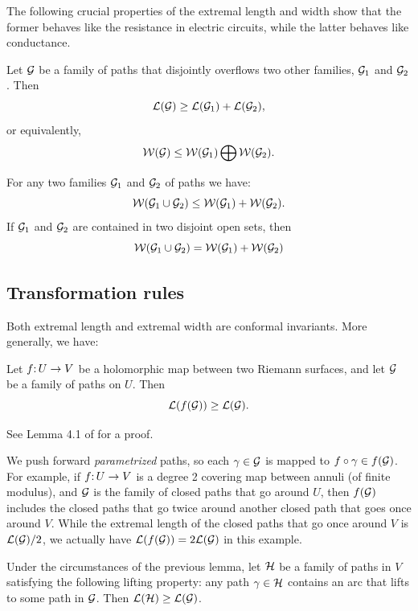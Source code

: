 The following crucial properties of the extremal length and width show
that the former behaves like the resistance in electric circuits,
while the latter behaves like conductance.

\begin{serieslaw}
Let ${\mathcal G}$ be a family of paths that disjointly overflows two other families,
                      ${\mathcal G}_1$ and ${\mathcal G}_2$.
Then
$$  {\mathcal L}({\mathcal G}) \geq {\mathcal L}({\mathcal G}_1) + {\mathcal L}({\mathcal G}_2), $$
or equivalently,
$$  {\mathcal W}({\mathcal G})\leq {\mathcal W}({\mathcal G}_1)\bigoplus {\mathcal W}({\mathcal G}_2). $$
\end{serieslaw}

\begin{parallellaw}
  For any two families ${\mathcal G}_1$ and ${\mathcal G}_2$ of paths we have:
$$
    {\mathcal W}({\mathcal G}_1\cup {\mathcal G}_2)\leq {\mathcal W}({\mathcal G}_1) + {\mathcal W}({\mathcal G}_2).
$$
If ${\mathcal G}_1$ and ${\mathcal G}_2$ are contained in two disjoint open sets, then
$$
  {\mathcal W}({\mathcal G}_1\cup {\mathcal G}_2) = {\mathcal W}({\mathcal G}_1) + {\mathcal W}({\mathcal G}_2)
$$
\end{parallellaw}



\subsection{Transformation rules}\label{trans rules sec}
 Both extremal length and extremal width  are conformal invariants.
 More generally, we have:
\begin{lem}\label{increase}
   Let $f\mathpunct: U\to V$ be a holomorphic map between two Riemann surfaces,
and let ${\mathcal G}$ be a family of paths on $U$. Then
$$
      {\mathcal L}(f({\mathcal G}))\geq {\mathcal L}({\mathcal G}).
$$
\end{lem}
See Lemma 4.1 of \cite{covering lemma} for a proof.
\begin{rem}
We push forward \emph{parametrized} paths, so each $\gamma \in {\mathcal G}$ is mapped to $f \circ \gamma \in f({\mathcal G})$. 
For example, if $f\mathpunct: U\to V$ is a degree 2 covering map between annuli (of finite modulus), and ${\mathcal G}$ is the family of closed paths that go around $U$,
then $f({\mathcal G})$ includes the closed paths that go twice around another closed path that goes once around $V$. 
While the extremal length of the closed paths that go once around $V$ is ${\mathcal L}({\mathcal G})/2$,
we actually have ${\mathcal L}(f({\mathcal G})) = 2 {\mathcal L}({\mathcal G})$ in this example.
\end{rem}

\begin{cor}\label{two families}
     Under the circumstances of the previous lemma,
let ${\mathcal H}$ be a family of paths in $V$ satisfying the following lifting
property: any path $\gamma\in {\mathcal H}$ contains an arc that lifts to some path
in ${\mathcal G}$. Then ${\mathcal L}({\mathcal H})\geq {\mathcal L}({\mathcal G})$.
\end{cor}

